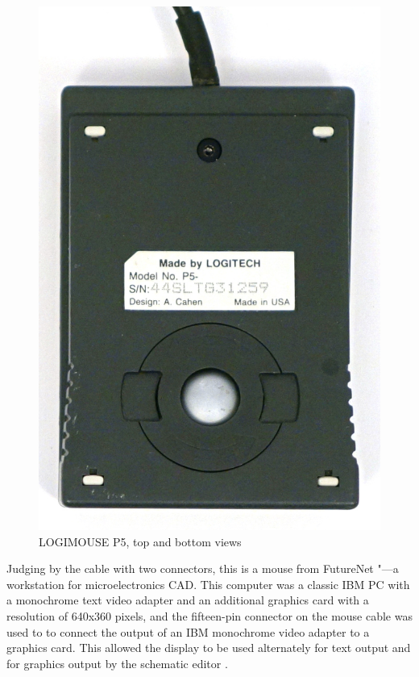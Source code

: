 \documentclass[11pt, a4paper]{article}
\begin{document}
\begin{figure}[h]
    \includegraphics[scale=0.4]{1983_logitech_logimouse_p5/bottom_30.jpg}
    \caption{LOGIMOUSE P5, top and bottom views}
    \label{fig:LogimouseP5TopAndBottom}
\end{figure}

Judging by the cable with two connectors, this is a mouse from FutureNet "---a workstation for microelectronics CAD. This computer was a classic IBM PC with a monochrome text video adapter and an additional graphics card with a resolution of 640x360 pixels, and the fifteen-pin connector on the mouse cable was used to to connect the output of an IBM monochrome video adapter to a graphics card. This allowed the display to be used alternately for text output and for graphics output by the schematic editor \cite{futurenet}.
\end{document}
